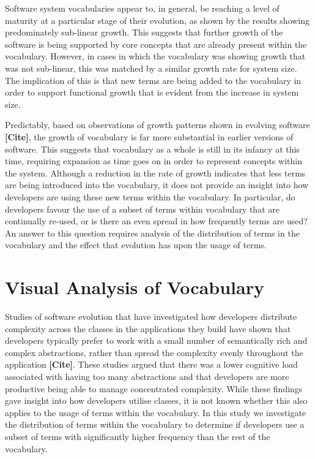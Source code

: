 Software system vocabularies appear to, in general, be reaching a level of maturity at a particular stage of their evolution, as shown by the results showing predominately sub-linear growth. This suggests that further growth of the software is being supported by core concepts that are already present within the vocabulary. However, in cases in which the vocabulary was showing growth that was not sub-linear, this was matched by a similar growth rate for system size. The implication of this is that new terms are being added to the vocabulary in order to support functional growth that is evident from the increase in system size.

Predictably, based on observations of growth patterns shown in evolving software \textbf{[Cite]}, the growth of vocabulary is far more substantial in earlier versions of software. This suggests that vocabulary as a whole is still in its infancy at this time, requiring expansion as time goes on in order to represent concepts within the system. Although a reduction in the rate of growth indicates that less terms are being introduced into the vocabulary, it does not provide an insight into how developers are using these new terms within the vocabulary. In particular, do developers favour the use of a subset of terms within vocabulary that are continually re-used, or is there an even spread in how frequently terms are used? An answer to this question requires analysis of the distribution of terms in the vocabulary and the effect that evolution has upon the usage of terms.


\section{Visual Analysis of Vocabulary} %
\label{sec:visual_analysis_of_vocabulary}

Studies of software evolution that have investigated how developers distribute complexity across the classes in the applications they build have shown that developers typically prefer to work with a small number of semantically rich and complex abstractions, rather than spread the complexity evenly throughout the application \textbf{[Cite]}. These studies argued that there was a lower cognitive load associated with having too many abstractions and that developers are more productive being able to manage concentrated complexity. While these findings gave insight into how developers utilise classes, it is not known whether this also applies to the usage of terms within the vocabulary. In this study we investigate the distribution of terms within the vocabulary to determine if developers use a subset of terms with significantly higher frequency than the rest of the vocabulary.

